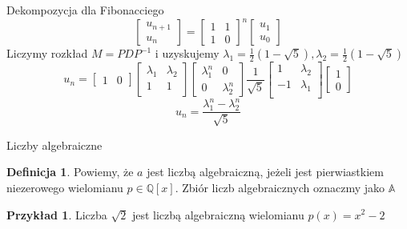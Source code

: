 \documentclass[handout]{beamer}
\def\Q{\mathbb{Q}}
\theoremstyle{definition}
\newtheorem*{definicja}{Definicja}
\newtheorem*{przyklad}{Przykład}
\theoremstyle{named}
\begin{document}
\begin{frame}{Dekompozycja dla Fibonacciego}
    \begin{equation*}
        \begin{bmatrix}
        u_{n+1} \\
        u_{n}
        \end{bmatrix}
        = 
        \begin{bmatrix}
        1 & 1\\
        1 & 0
        \end{bmatrix}^n
        \begin{bmatrix}
        u_1 \\
        u_0 
        \end{bmatrix}

    \end{equation*}
    Liczymy rozkład $M = PDP^{-1}$ i uzyskujemy $\lambda_1 =  \frac{1}{2} \left(1-\sqrt{5}\right), \lambda_2 = \frac{1}{2} \left(1-\sqrt{5}\right) $
\begin{equation*}
    u_n = 
        \begin{bmatrix}
           1 & 0
        \end{bmatrix}
        \begin{bmatrix}
            \lambda_1 & \lambda_2 \\
         1 & 1 \\
        \end{bmatrix}
        \begin{bmatrix}
           \lambda_1^{n} & 0 \\
            0 & \lambda_2^{n}
        \end{bmatrix}
        \frac{1}{\sqrt{5}}
        \begin{bmatrix}
           1 & \lambda_2 \\
           -1  & \lambda_1 \\
        \end{bmatrix} 
        \begin{bmatrix}
           1 \\
           0
        \end{bmatrix}
    \end{equation*}
    \begin{equation*}
        u_n = \frac{\lambda_1^{n} - \lambda_2^{n}}{\sqrt{5}}
    \end{equation*}
 
 
\end{frame}

\begin{frame}{Liczby algebraiczne}
\begin{definicja}
    Powiemy, że $a $ jest liczbą algebraiczną, jeżeli jest pierwiastkiem niezerowego wielomianu $p \in \Q[x]$. Zbiór liczb algebraicznych oznaczmy jako $\mathbb{A}$
\end{definicja}

\begin{przyklad}
    Liczba $\sqrt{2}$ jest liczbą algebraiczną wielomianu $p(x) = x^{2} - 2$
\end{przyklad}

\end{frame}
\end{document}
